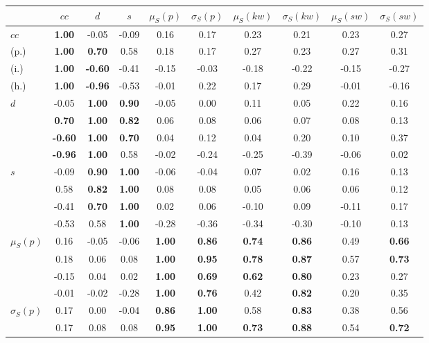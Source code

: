 \begin{table*}[h!]
\begin{center}
\begin{tabular}{| l || c | c | c | c | c | c | c | c | c |}\hline
 & $cc$ & $d$ & $s$ & $\mu_S(p)$ & $\sigma_S(p)$ & $\mu_S(kw)$ & $\sigma_S(kw)$ & $\mu_S(sw)$ & $\sigma_S(sw)$ \\\hline\hline
$cc$ & {\bf 1.00} & -0.05 & -0.09 & 0.16 & 0.17 & 0.23 & 0.21 & 0.23 & 0.27 \\
(p.) & {\bf 1.00} & {\bf 0.70} & 0.58 & 0.18 & 0.17 & 0.27 & 0.23 & 0.27 & 0.31 \\
(i.) & {\bf 1.00} & {\bf -0.60} & -0.41 & -0.15 & -0.03 & -0.18 & -0.22 & -0.15 & -0.27 \\
(h.) & {\bf 1.00} & {\bf -0.96} & -0.53 & -0.01 & 0.22 & 0.17 & 0.29 & -0.01 & -0.16 \\\hline
$d$ & -0.05 & {\bf 1.00} & {\bf 0.90} & -0.05 & 0.00 & 0.11 & 0.05 & 0.22 & 0.16 \\
 & {\bf 0.70} & {\bf 1.00} & {\bf 0.82} & 0.06 & 0.08 & 0.06 & 0.07 & 0.08 & 0.13 \\
 & {\bf -0.60} & {\bf 1.00} & {\bf 0.70} & 0.04 & 0.12 & 0.04 & 0.20 & 0.10 & 0.37 \\
 & {\bf -0.96} & {\bf 1.00} & 0.58 & -0.02 & -0.24 & -0.25 & -0.39 & -0.06 & 0.02 \\\hline
$s$ & -0.09 & {\bf 0.90} & {\bf 1.00} & -0.06 & -0.04 & 0.07 & 0.02 & 0.16 & 0.13 \\
 & 0.58 & {\bf 0.82} & {\bf 1.00} & 0.08 & 0.08 & 0.05 & 0.06 & 0.06 & 0.12 \\
 & -0.41 & {\bf 0.70} & {\bf 1.00} & 0.02 & 0.06 & -0.10 & 0.09 & -0.11 & 0.17 \\
 & -0.53 & 0.58 & {\bf 1.00} & -0.28 & -0.36 & -0.34 & -0.30 & -0.10 & 0.13 \\\hline
$\mu_S(p)$ & 0.16 & -0.05 & -0.06 & {\bf 1.00} & {\bf 0.86} & {\bf 0.74} & {\bf 0.86} & 0.49 & {\bf 0.66} \\
 & 0.18 & 0.06 & 0.08 & {\bf 1.00} & {\bf 0.95} & {\bf 0.78} & {\bf 0.87} & 0.57 & {\bf 0.73} \\
 & -0.15 & 0.04 & 0.02 & {\bf 1.00} & {\bf 0.69} & {\bf 0.62} & {\bf 0.80} & 0.23 & 0.27 \\
 & -0.01 & -0.02 & -0.28 & {\bf 1.00} & {\bf 0.76} & 0.42 & {\bf 0.82} & 0.20 & 0.35 \\\hline
$\sigma_S(p)$ & 0.17 & 0.00 & -0.04 & {\bf 0.86} & {\bf 1.00} & 0.58 & {\bf 0.83} & 0.38 & 0.56 \\
 & 0.17 & 0.08 & 0.08 & {\bf 0.95} & {\bf 1.00} & {\bf 0.73} & {\bf 0.88} & 0.54 & {\bf 0.72} \\

\end{tabular}
\end{center}
\end{table*}
